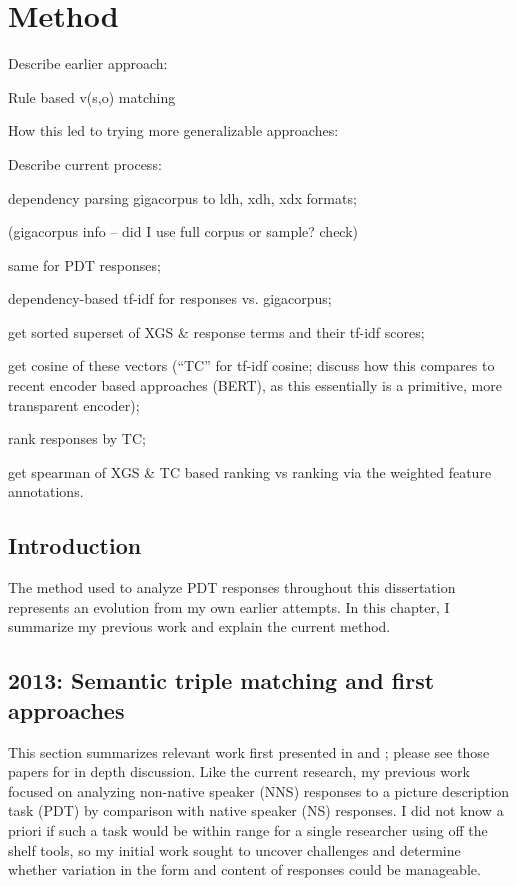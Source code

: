 \chapter{Method}
\label{chap:method}
Describe earlier approach:

Rule based v(s,o) matching

How this led to trying more generalizable approaches:

Describe current process:

dependency parsing gigacorpus to ldh, xdh, xdx formats;

(gigacorpus info -- did I use full corpus or sample? check)

same for PDT responses;

dependency-based tf-idf for responses vs. gigacorpus;

get sorted superset of XGS \& response terms and their tf-idf scores;

get cosine of these vectors (``TC'' for tf-idf cosine; discuss how this compares to recent encoder based approaches (BERT), as this essentially is a primitive, more transparent encoder);

rank responses by TC;

get spearman of XGS \& TC based ranking vs ranking via the weighted feature annotations.

\section{Introduction}
The method used to analyze PDT responses throughout this dissertation represents an evolution from my own earlier attempts. In this chapter, I summarize my previous work and explain the current method.

\section{2013: Semantic triple matching and first approaches}
This section summarizes relevant work first presented in \citet{king:dickinson:13} and \citet{king:dickinson:14}; please see those papers for in depth discussion. Like the current research, my previous work focused on analyzing non-native speaker (NNS) responses to a picture description task (PDT) by comparison with native speaker (NS) responses. I did not know a priori if such a task would be within range for a single researcher using off the shelf tools, so my initial work sought to uncover challenges and determine whether variation in the form and content of responses could be manageable.

